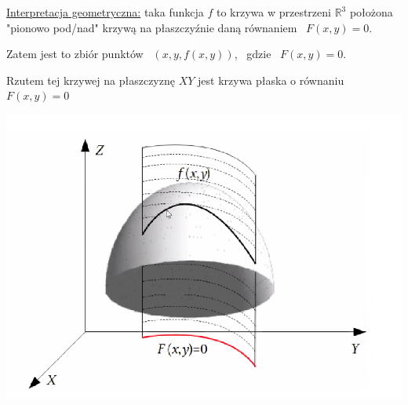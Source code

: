 \underline{Interpretacja geometryczna:} taka funkcja $f$ to krzywa w przestrzeni $ \mathbb{R}^3 $ położona "pionowo pod/nad" krzywą na płaszczyźnie
daną równaniem \ $F(x,y) = 0$.

Zatem jest to zbiór punktów \ $ (x, y, f(x,y)) $, \ gdzie \ $ F(x,y) = 0 $.

Rzutem tej krzywej na płaszczyznę $XY$ jest krzywa płaska o równaniu $F(x,y) = 0$

\begin{center}
\includegraphics[scale=0.4]{img/rzut_plaszczyznaXY.png}
\end{center}

